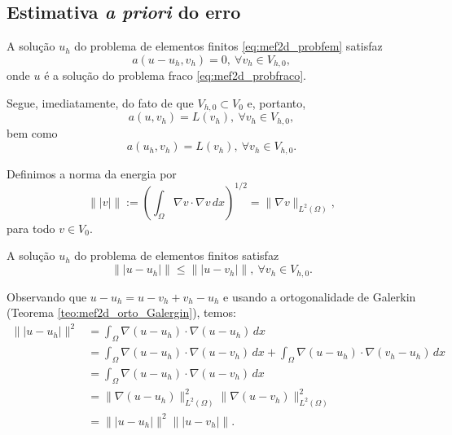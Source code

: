 \subsection{Estimativa {\it a priori} do erro}
\badgeRevisar

\begin{teo}\label{teo:mef2d_orto_Galergin}
  A solução $u_h$ do problema de elementos finitos \eqref{eq:mef2d_probfem} satisfaz
  \begin{equation}
    a(u-u_h,v_h) = 0,~\forall v_h\in V_{h,0},
  \end{equation}
onde $u$ é a solução do problema fraco \eqref{eq:mef2d_probfraco}.
\end{teo}
\begin{dem}
  Segue, imediatamente, do fato de que $V_{h,0}\subset V_0$ e, portanto,
  \begin{equation}
    a(u,v_h) = L(v_h),~\forall v_h\in V_{h,0},
  \end{equation}
bem como
  \begin{equation}
    a(u_h,v_h) = L(v_h),~\forall v_h\in V_{h,0}.
  \end{equation}
\end{dem}

\begin{defn}
  Definimos a norma da energia por
  \begin{equation}
    \||v|\| := \left(\int_{\Omega} \nabla v\cdot\nabla v\,dx\right)^{1/2} = \|\nabla v\|_{L^2(\Omega)},
  \end{equation}
para todo $v\in V_0$.
\end{defn}

\begin{teo}\label{teo:mef2d_melhor_aprox}
  A solução $u_h$ do problema de elementos finitos satisfaz
  \begin{equation}
    \||u-u_h|\| \leq \||u-v_h|\|,~\forall v_h\in V_{h,0}.
  \end{equation}
\end{teo}
\begin{dem}
  Observando que $u-u_h=u-v_h+v_h-u_h$ e usando a ortogonalidade de Galerkin (Teorema \ref{teo:mef2d_orto_Galergin}), temos:
  \begin{align}
    \||u-u_h|\|^2 &= \int_\Omega \nabla (u-u_h)\cdot\nabla (u-u_h)\,dx\\
    &= \int_{\Omega} \nabla (u-u_h)\cdot\nabla (u-v_h)\,dx + \int_{\Omega} \nabla (u-u_h)\cdot\nabla (v_h-u_h)\,dx\\
    &= \int_{\Omega} \nabla (u-u_h)\cdot\nabla (u-v_h)\,dx\\
    &= \|\nabla (u-u_h)\|_{L^2(\Omega)}^2\|\nabla (u-v_h)\|_{L^2(\Omega)}^2\\
    &= \||u-u_h|\|^2\||u-v_h|\|.
  \end{align}
\end{dem}

